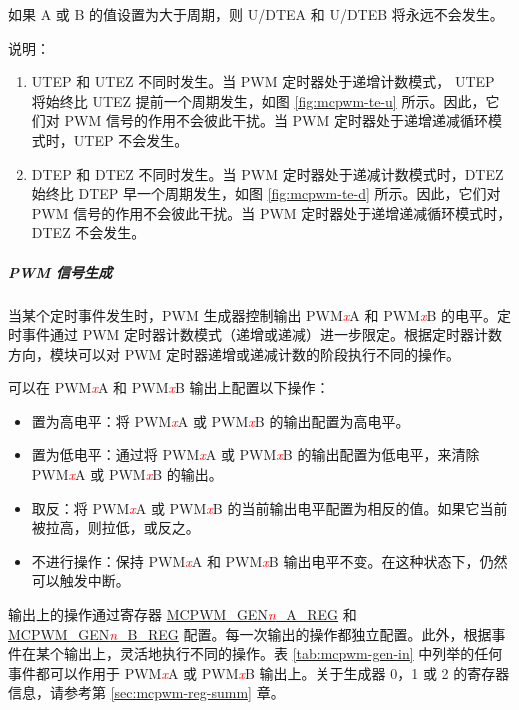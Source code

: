 \documentclass[main\_\_CN.tex]{subfiles}
\begin{document}
如果 A 或 B 的值设置为大于周期，则 U/DTEA 和 U/DTEB 将永远不会发生。




说明：
\begin{enumerate}
    \item UTEP 和 UTEZ 不同时发生。当 PWM 定时器处于递增计数模式， UTEP 将始终比 UTEZ 提前一个周期发生，如图 \ref{fig:mcpwm-te-u} 所示。因此，它们对 PWM 信号的作用不会彼此干扰。当 PWM 定时器处于递增递减循环模式时，UTEP 不会发生。
    \item DTEP 和 DTEZ 不同时发生。当 PWM 定时器处于递减计数模式时，DTEZ 始终比 DTEP 早一个周期发生，如图 \ref{fig:mcpwm-te-d} 所示。因此，它们对 PWM 信号的作用不会彼此干扰。当 PWM 定时器处于递增递减循环模式时，DTEZ 不会发生。
\end{enumerate}

\subparagraph{PWM 信号生成}
\label{subpara:mcpwm-op-gen}
当某个定时事件发生时，PWM 生成器控制输出 PWM\textcolor{red}{\it{x}}A 和 PWM\textcolor{red}{\it{x}}B 的电平。定时事件通过 PWM 定时器计数模式（递增或递减）进一步限定。根据定时器计数方向，模块可以对 PWM 定时器递增或递减计数的阶段执行不同的操作。

可以在 PWM\textcolor{red}{\it{x}}A 和 PWM\textcolor{red}{\it{x}}B 输出上配置以下操作：

\begin{itemize}
    \item 置为高电平：将 PWM\textcolor{red}{\it{x}}A 或 PWM\textcolor{red}{\it{x}}B 的输出配置为高电平。
    \item 置为低电平：通过将 PWM\textcolor{red}{\it{x}}A 或 PWM\textcolor{red}{\it{x}}B 的输出配置为低电平，来清除 PWM\textcolor{red}{\it{x}}A 或 PWM\textcolor{red}{\it{x}}B 的输出。
    \item 取反：将 PWM\textcolor{red}{\it{x}}A 或 PWM\textcolor{red}{\it{x}}B 的当前输出电平配置为相反的值。如果它当前被拉高，则拉低，或反之。
    \item 不进行操作：保持 PWM\textcolor{red}{\it{x}}A 和 PWM\textcolor{red}{\it{x}}B 输出电平不变。在这种状态下，仍然可以触发中断。
\end{itemize}

输出上的操作通过寄存器 \hyperref[regdesc:MCPWMGENNAREG]{MCPWM\_GEN\textcolor{red}{\it{n}}\_A\_REG} 和 \hyperref[regdesc:MCPWMGENNBREG]{MCPWM\_GEN\textcolor{red}{\it{n}}\_B\_REG} 配置。每一次输出的操作都独立配置。此外，根据事件在某个输出上，灵活地执行不同的操作。表 \ref{tab:mcpwm-gen-in} 中列举的任何事件都可以作用于 PWM\textcolor{red}{\it{x}}A 或 PWM\textcolor{red}{\it{x}}B 输出上。关于生成器 0，1 或 2 的寄存器信息，请参考第 \ref{sec:mcpwm-reg-summ} 章。
\end{document}
